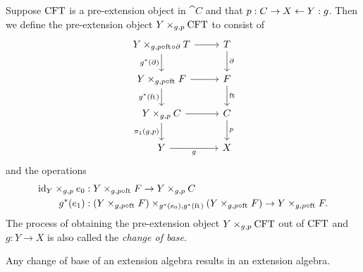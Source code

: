 \begin{defn}\label{cobesys}
Suppose $\mathrm{CFT}$ is a pre-extension object in $\cat{C}$ and that 
$p:C\rightarrow X\leftarrow Y:g$.
Then we define the pre-extension object $\cobesys{Y}{\stesys}{g}{p}$ to consist of
\begin{equation*}
\begin{tikzcd}
\cobesys{Y}{\stesyst}{g}{p\circ\eft\circ\ebd}
  \ar{r}
  \ar{d}[swap]{g^\ast(\ebd)}
  &
\stesyst
  \ar{d}{\ebd}
  \\
\cobesys{Y}{\stesysf}{g}{p\circ\eft}
  \ar{r}
  \ar{d}[swap]{g^\ast(\eft)}
  &
\stesysf
  \ar{d}{\eft}
  \\
\cobesys{Y}{\stesysc}{g}{p}
  \ar{r}
  \ar{d}[swap]{\pullbackpr{1}{g}{p}}
  &
\stesysc
  \ar{d}{p}
  \\
Y \ar{r}[swap]{g}
  &
X
\end{tikzcd}
\end{equation*} 
and the operations
\begin{align*}
\pullback{\catid{Y}}{\ectxext}{g}{p} 
  & : \pullback{Y}{\stesysf}{g}{p\circ\eft}\to \pullback{Y}{\stesysc}{g}{p}\\
g^\ast(\efamext) & : 
  \pullback{%
    \pullback{Y}{\stesysf}{g}{p\circ\eft}}{%
    \pullback{Y}{\stesysf}{g}{p\circ\eft}}{%
    g^\ast(\ectxext)}{%
    g^\ast(\eft)}
  \to 
  \pullback{Y}{\stesysf}{g}{p\circ\eft}.
\end{align*}
The process of obtaining the pre-extension object $\cobesys{Y}{\stesys}{g}{p}$ out of $\mathrm{CFT}$
and $g:Y\to X$ is also called the \emph{change of base}.
\end{defn}

\begin{lem}
Any change of base of an extension algebra results in an extension algebra.
\end{lem}

